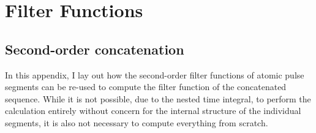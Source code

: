 
\setchapterpreamble[u]{\margintoc}
\chapter{Filter Functions}\label{ch:appendix:filter_functions}
\section{Second-order concatenation}\label{sec:appendix:concatenation}
In this appendix, I lay out how the second-order filter functions of atomic pulse segments can be re-used to compute the filter function of the concatenated sequence.
While it is not possible, due to the nested time integral, to perform the calculation entirely without concern for the internal structure of the individual segments, it is also not necessary to compute everything from scratch.

